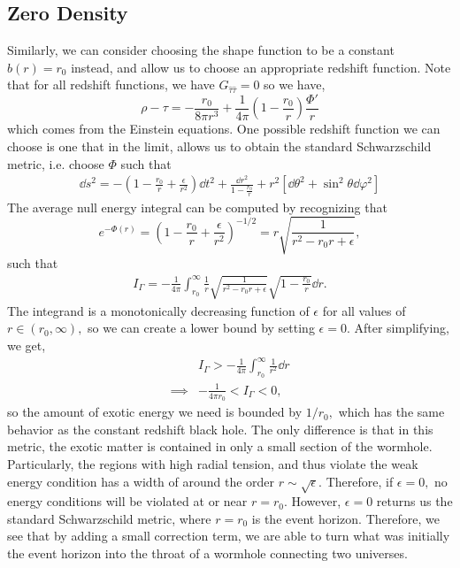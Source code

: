 \documentclass[%
 reprint,
 amsmath,amssymb
 aps,
]{revtex4}
\theoremstyle{remark}
\begin{document}
\subsection{Zero Density}
Similarly, we can consider choosing the shape function to be a constant $b(r)=r_0$ instead, and allow us to choose an appropriate redshift function. Note that for all redshift functions, we have $G_{\hat{\tau}\hat{\tau}}=0$ so we have,
\begin{equation}
    \rho - \tau = -\frac{r_0}{8\pi r^3} + \frac{1}{4\pi}\left(1-\frac{r_0}{r}\right)\frac{\Phi'}{r}
\end{equation}
which comes from the Einstein equations. One possible redshift function we can choose is one that in the limit, allows us to obtain the standard Schwarzschild metric, i.e. choose $\Phi$ such that
\begin{align}
    \dd{s}^2 = -\left(1-\frac{r_0}{r}+\frac{\epsilon}{r^2}\right)\dd{t}^2 + \frac{\dd{r}^2}{1-\frac{r_0}{r}} + r^2\left[\dd{\theta}^2 + \sin^2\theta\dd{\varphi}^2\right]
\end{align}
The average null energy integral can be computed by recognizing that 
\begin{equation}
    e^{-\Phi(r)} = \left(1-\frac{r_0}{r}+\frac{\epsilon}{r^2}\right)^{-1/2} = r\sqrt{\frac{1}{r^2-r_0r+\epsilon}},
\end{equation}
such that 
\begin{align}
    I_{\Gamma} = -\frac{1}{4\pi}\int_{r_0}^{\infty} \frac{1}{r}\sqrt{\frac{1}{r^2-r_0r+\epsilon}} \sqrt{1-\frac{r_0}{r}}\dd{r}.
\end{align}
The integrand is a monotonically decreasing function of $\epsilon$ for all values of $r\in (r_0,\infty),$ so we can create a lower bound by setting $\epsilon = 0.$ After simplifying, we get,
\begin{align}
    &I_{\Gamma} > -\frac{1}{4\pi}\int_{r_0}^{\infty}\frac{1}{r^2}\dd{r} \\ 
    \implies & -\frac{1}{4\pi r_0} < I_{\Gamma} < 0,
\end{align}
so the amount of exotic energy we need is bounded by $1/r_0,$ which has the same behavior as the constant redshift black hole. The only difference is that in this metric, the exotic matter is contained in only a small section of the wormhole. Particularly, the regions with high radial tension, and thus violate the weak energy condition has a width of around the order $r \sim \sqrt{\epsilon}$\cite{Visser}. Therefore, if $\epsilon = 0,$ no energy conditions will be violated at or near $r=r_0.$ However, $\epsilon = 0$ returns us the standard Schwarzschild metric, where $r=r_0$ is the event horizon. Therefore, we see that by adding a small correction term, we are able to turn what was initially the event horizon into the throat of a wormhole connecting two universes.
\end{document}
